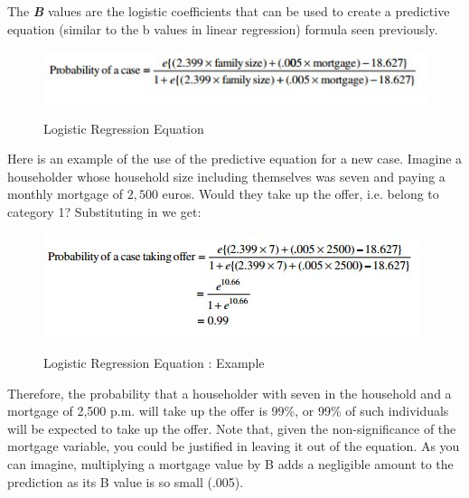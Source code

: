 \documentclass[a4paper,12pt]{article}
\begin{document}
The \textbf{\textit{B}} values are the logistic coefficients that can be used to create a predictive
equation (similar to the b values in linear regression) formula seen previously.
\begin{figure}
	\begin{center}
		\includegraphics[scale=0.75]{images/Logistic11}\\
		\caption{Logistic Regression Equation}
	\end{center}
\end{figure}

Here is an example of the use of the predictive equation for a new case. Imagine a
householder whose household size including themselves was seven and paying
a monthly mortgage of $2,500$ euros. Would they take up the offer, i.e. belong to category 1?
Substituting in we get:
\begin{figure}
	\begin{center}
		\includegraphics[scale=0.75]{images/Logistic12}\\
		\caption{Logistic Regression Equation : Example}
	\end{center}
\end{figure}

Therefore, the probability that a householder with seven in the household and a mortgage of 2,500 p.m. will take up the offer is 99\%, or 99\% of such individuals will be
expected to take up the offer.
Note that, given the non-significance of the mortgage variable, you could be justified
in leaving it out of the equation. As you can imagine, multiplying a mortgage value by
B adds a negligible amount to the prediction as its B value is so small (.005).
\end{document}
